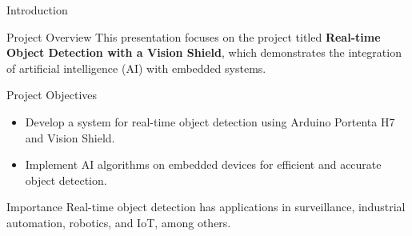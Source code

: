 %
%
%
%



\begin{frame}{Introduction}
 
  
  	\begin{block}{Project Overview}
  	This presentation focuses on the project titled \textbf{Real-time Object Detection with a Vision Shield}, which demonstrates the integration of artificial intelligence (AI) with embedded systems.
  \end{block}
  
  
  \begin{block}{Project Objectives}
  	\begin{itemize}
  		\item Develop a system for real-time object detection using Arduino Portenta H7 and Vision Shield.
  		\item Implement AI algorithms on embedded devices for efficient and accurate object detection.
  	\end{itemize}
  \end{block}
  
  \begin{block}{Importance}
  	Real-time object detection has applications in surveillance, industrial automation, robotics, and IoT, among others.
  \end{block}

  \nocite{*}

  {\tiny 
%  
    \printbibliography %
  }

\end{frame}